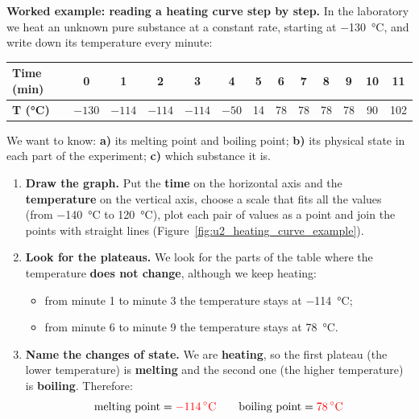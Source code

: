 \begin{example}
    \textbf{Worked example: reading a heating curve step by step.} In the laboratory we heat an unknown pure substance at a constant rate, starting at \qty{-130}{\celsius}, and write down its temperature every minute:
    \begin{center}
        \renewcommand{\arraystretch}{1.3}
        \begin{tabular}{@{}lcccccccccccc@{}}
            \toprule
            \textbf{Time (min)} & \textbf{0} & \textbf{1} & \textbf{2} & \textbf{3} & \textbf{4} & \textbf{5} & \textbf{6} & \textbf{7} & \textbf{8} & \textbf{9} & \textbf{10} & \textbf{11} \\
            \midrule
            \textbf{T (\unit{\celsius})} & \(-130\) & \(-114\) & \(-114\) & \(-114\) & \(-50\) & 14 & 78 & 78 & 78 & 78 & 90 & 102 \\
            \bottomrule
        \end{tabular}
    \end{center}
    We want to know: \textbf{a)} its melting point and boiling point; \textbf{b)} its physical state in each part of the experiment; \textbf{c)} which substance it is.
    \begin{enumerate}[label=\numberballmDarkTeal]
        \item \textbf{Draw the graph.} Put the \textbf{time} on the horizontal axis and the \textbf{temperature} on the vertical axis, choose a scale that fits all the values (from \qty{-140}{\celsius} to \qty{120}{\celsius}), plot each pair of values as a point and join the points with straight lines (Figure~\ref{fig:u2_heating_curve_example}).
        \item \textbf{Look for the plateaus.} We look for the parts of the table where the temperature \textbf{does not change}, although we keep heating:
        \begin{itemize}
            \item from minute 1 to minute 3 the temperature stays at \qty{-114}{\celsius};
            \item from minute 6 to minute 9 the temperature stays at \qty{78}{\celsius}.
        \end{itemize}
        \item \textbf{Name the changes of state.} We are \textbf{heating}, so the first plateau (the lower temperature) is \textbf{melting} and the second one (the higher temperature) is \textbf{boiling}. Therefore:
        \[
            \text{melting point} = \textcolor{red}{\qty{-114}{\celsius}} \qquad \text{boiling point} = \textcolor{red}{\qty{78}{\celsius}}
\]
\end{enumerate}
\end{example}
